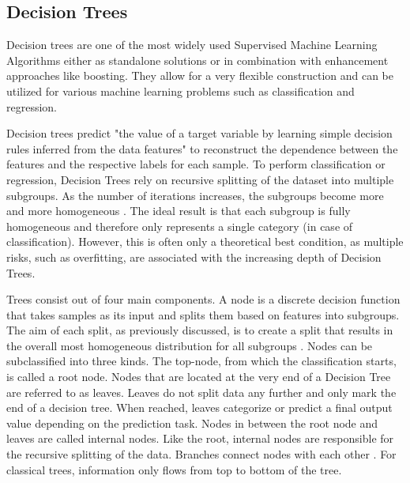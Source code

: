 \subsection{Decision Trees}

Decision trees are one of the most widely used Supervised Machine Learning Algorithms either 
as standalone solutions or in combination with enhancement approaches like boosting. 
They allow for a very flexible construction and can be utilized for various machine learning problems
such as classification and regression.

Decision trees predict "the value of a target variable by learning simple decision rules inferred 
from the data features" \cite{scikit-decision_tree} to reconstruct the dependence between the features and the respective labels for
each sample. To perform classification or regression, Decision Trees rely on recursive 
splitting of the dataset into multiple subgroups. As the number of iterations increases, the 
subgroups become more and more homogeneous \cite[p.330]{James2021}. The ideal result is that each subgroup is fully 
homogeneous and therefore only represents a single category (in case of classification). However, 
this is often only a theoretical best condition, as multiple risks, such as overfitting, are 
associated with the increasing depth of Decision Trees.

Trees consist out of four main components. A node is a discrete decision function that takes 
samples as its input and splits them based on features into subgroups. The aim of each split, 
as previously discussed, is to create a split that results in the overall most homogeneous 
distribution for all subgroups \cite[p.6]{lewis2000introduction}. Nodes can be subclassified into three kinds. The top-node, 
from which the classification starts, is called a root node. Nodes that are located at the 
very end of a Decision Tree are referred to as leaves. Leaves do not split data any further and 
only mark the end of a decision tree. When reached, leaves categorize or predict a final output 
value depending on the prediction task. Nodes in between the root node and leaves are called 
internal nodes. Like the root, internal nodes are responsible for the recursive splitting of 
the data. Branches connect nodes with each other \cite[p.4]{lewis2000introduction}. For classical trees, information only flows from 
top to bottom of the tree.

